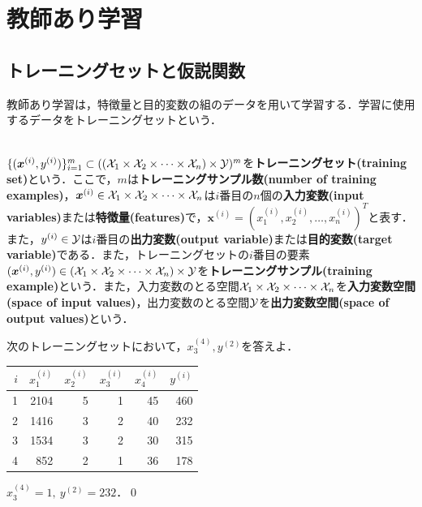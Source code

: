 \chapter{教師あり学習}

\section{トレーニングセットと仮説関数}

教師あり学習は，特徴量と目的変数の組のデータを用いて学習する．学習に使用するデータをトレーニングセットという．

\begin{defi}[トレーニングセット]
　\\
$\{(\bm{x}^{(i)},y^{(i)})\}_{i=1}^m \subset (({\cal X}_1 \times {\cal X}_2\times \cdots \times{\cal X}_n) \times {\cal Y})^m$を{\bf トレーニングセット(training set)}という．ここで，$m$は{\bf トレーニングサンプル数(number of training examples)}，${\bm x}^{(i)} \in {\cal X}_1 \times {\cal X}_2\times \cdots \times {\cal X}_n$は$i$番目の$n$個の{\bf 入力変数(input variables)}または{\bf 特徴量(features)}で，${\bm x}^{(i)}=(x_1^{(i)},x_2^{(i)},\ldots,x_n^{(i)})^T$と表す．また，$y^{(i)} \in {\cal Y}$は$i$番目の{\bf 出力変数(output variable)}または{\bf 目的変数(target variable)}である．また，トレーニングセットの$i$番目の要素$({\bm x}^{(i)},y^{(i)})\in ({\cal X}_1 \times {\cal X}_2\times \cdots \times{\cal X}_n) \times {\cal Y}$を{\bf トレーニングサンプル(training example)}という．また，入力変数のとる空間${\cal X}_1 \times {\cal X}_2\times \cdots \times{\cal X}_n$を{\bf 入力変数空間(space of input values)}，出力変数のとる空間${\cal Y}$を{\bf 出力変数空間(space of output values)}という．
\end{defi}

\begin{qu}
次のトレーニングセットにおいて，$x_3^{(4)},y^{(2)}$を答えよ．
\begin{table}[H]
\centering
\begin{tabular}{rrrrrr}
\hline
$i$ &$x_1^{(i)}$ &$x_2^{(i)}$ &$x_3^{(i)}$ &$x_4^{(i)}$ & $y^{(i)}$ \\ \hline
1 & 2104 & 5 & 1 & 45 & 460 \\
2 & 1416 & 3 & 2 & 40 & 232 \\
3 & 1534 & 3 & 2 & 30 & 315 \\
4 & 852  & 2 & 1 & 36 & 178 \\ \hline
\end{tabular}
\end{table}
\end{qu}
\begin{ans}
$x_3^{(4)}=1,~y^{(2)}=232$．\qed
\end{ans}

